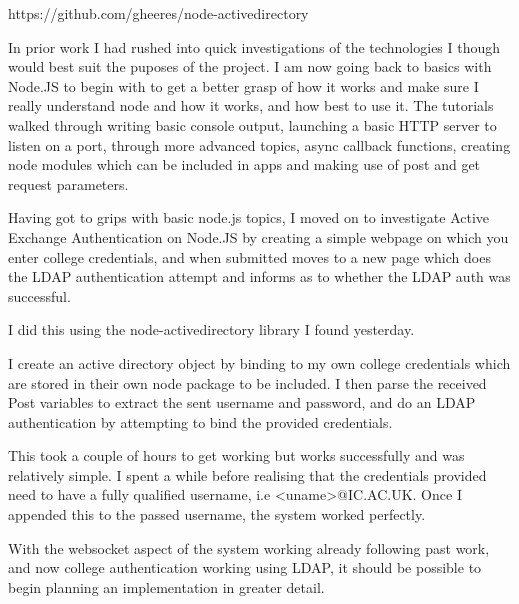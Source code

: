 \documentclass[idxtotoc,hyperref,openany]{labbook} %
\begin{document}
https://github.com/gheeres/node-activedirectory




In prior work I had rushed into quick investigations of the technologies I though would best suit the puposes of the project.  I am now going back to basics with Node.JS to begin with to get a better grasp of how it works and make sure I really understand node and how it works, and how best to use it.  The tutorials walked through writing basic console output, launching a basic HTTP server to listen on a port, through more advanced topics, async callback functions, creating node modules which can be included in apps and making use of post and get request parameters.


Having got to grips with basic node.js topics, I moved on to investigate Active Exchange Authentication on Node.JS by creating a simple webpage on which you enter college credentials, and when submitted moves to a new page which does the LDAP authentication attempt and informs as to whether the LDAP auth was successful.

I did this using the node-activedirectory library I found yesterday.

I create an active directory object by binding to my own college credentials which are stored in their own node package to be included.  I then parse the received Post variables to extract the sent username and password, and do an LDAP authentication by attempting to bind the provided credentials.

This took a couple of hours to get working but works successfully and was relatively simple.  I spent a while before realising that the credentials provided need to have a fully qualified username, i.e <uname>@IC.AC.UK.  Once I appended this to the passed username, the system worked perfectly.

With the websocket aspect of the system working already following past work, and now college authentication working using LDAP, it should be possible to begin planning an implementation in greater detail.


\end{document}
